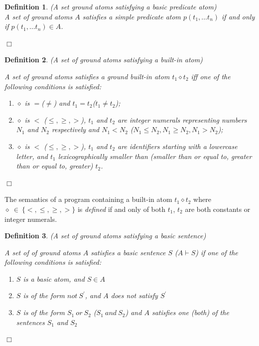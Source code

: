 \documentclass[a4paper,10pt]{article}
\newtheorem{definition}{Definition}
\begin{document}
\begin{definition}(A set ground atoms satisfying a basic predicate atom) \\
\rm{
A set of ground atoms $A$ satisfies a simple predicate atom $p(t_1,\ldots t_n)$  if and only if $p(t_1,\ldots t_n) \in A$.
}

\hfill$\Box$
\end{definition}

\begin{definition} (A set of ground atoms satisfying a built-in  atom)\\
{\rm
A set of ground atoms satisfies a ground built-in atom $t_1 \diamond t_2$ iff one of the following conditions is satisfied:
\begin{enumerate}
\item $\diamond$ is $=$($\not =$) and $t_1 = t_2$($t_1 \not= t_2$);
\item $\diamond$ is $<$ ($\le,\ge, >$), $t_1$ and $t_2$ are integer numerals representing numbers $N_1$ and $N_2$ respectively and
 $N_1 < N_2$ ($N_1 \le N_2, N_1 \ge N_2, N_1 > N_2$);
\item $\diamond$ is $<$ ($\le,\ge, >$),  $t_1$ and $t_2$ are identifiers starting with a lowercase letter, and $t_1$  lexicographically smaller than (smaller than or equal to, greater than or equal to, greater) $t_2$.
\end{enumerate}
} 


\hfill$\Box$
\end{definition}

\medskip\noindent
The semantics of a program containing a built-in atom $t_1 \diamond t_2$ where $\diamond~\in~\{<, \le, \ge, >\}$ is \textit{defined} if and only of both $t_1$, $t_2$ are both constants or integer numerals.

\begin{definition}(A set of ground atoms satisfying a basic sentence) \\
\rm{
A set of of ground atoms $A$ satisfies a basic sentence $S$ ($A \vdash S$) if one of the following conditions is satisfied:
\begin{enumerate}
\item $S$ is a basic atom, and $S \in A$
\item $S$ is of the form $not~S^\prime$, and $A$ does not satisfy $S^\prime$
\item $S$ is of the form $S_1~or~S_2$ ($S_1~and~S_2$) and $A$ satisfies one (both) of the sentences  $S_1$ and $S_2$
\end{enumerate}
}

\hfill$\Box$
\end{definition}
\end{document}
